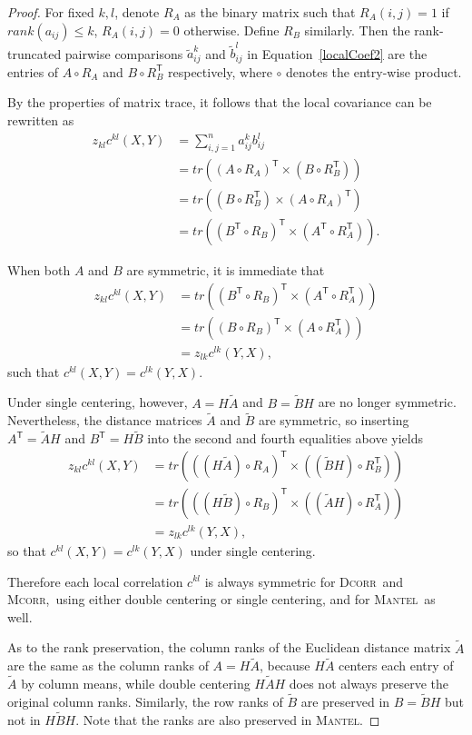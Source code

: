 \documentclass[11pt]{article}
\providecommand{\sct}[1]{{\normalfont\textsc{#1}}}
\providecommand{\mt}[1]{\widetilde{#1}}
\newcommand{\GG}{c}
\newcommand{\T}{^{\ensuremath{\mathsf{T}}}}           %
\newcommand{\Dcorr}{\sct{Dcorr}}
\newcommand{\Mcorr}{\sct{Mcorr}}
\newcommand{\Mantel}{\sct{Mantel}}
\begin{document}
\begin{proof}
For fixed $k,l$, denote $R_{A}$ as the binary matrix such that $R_{A}(i,j)=1$ if $rank(a_{ij}) \leq k$, $R_{A}(i,j)=0$ otherwise. Define $R_{B}$ similarly. Then the rank-truncated pairwise comparisons $\mt{a}_{ij}^k$ and $\mt{b}_{ij}^l$ in Equation~\ref{localCoef2} are the entries of $A \circ R_{A}$ and $B \circ R_{B}\T$ respectively, where $\circ$ denotes the entry-wise product.

By the properties of matrix trace, it follows that the local covariance can be rewritten as
\begin{align*}
z_{kl} \GG^{kl}(X,Y) &= \textstyle \sum_{i,j=1}^n a_{ij}^k b_{ij}^l \\
 &= tr((A \circ R_{A})\T \times (B \circ R_{B}\T)) \\
 &= tr((B \circ R_{B}\T) \times (A \circ R_{A})\T) \\
 &= tr((B\T \circ R_{B})\T \times (A\T \circ R_{A}\T)).
\end{align*}

When both $A$ and $B$ are symmetric, it is immediate that
\begin{align*}
z_{kl} \GG^{kl}(X,Y) &= tr((B\T \circ R_{B})\T \times (A\T \circ R_{A}\T)) \\
 &= tr((B \circ R_{B})\T \times (A \circ R_{A}\T)) \\
 &= z_{lk} \GG^{lk}(Y,X),
\end{align*}
such that $\GG^{kl}(X,Y)=\GG^{lk}(Y,X)$.

Under single centering, however, $A=H \tilde{A}$ and $B=\tilde{B}H$ are no longer symmetric. Nevertheless, the distance matrices $\tilde{A}$ and $\tilde{B}$ are symmetric, so inserting $A\T=\tilde{A}H$ and $B\T=H\tilde{B}$ into the second and fourth equalities above yields
\begin{align*}
z_{kl} \GG^{kl}(X,Y) &= tr(((H \tilde{A}) \circ R_{A})\T \times ((\tilde{B}H) \circ R_{B}\T)) \\
 &= tr(((H \tilde{B}) \circ R_{B})\T \times ((\tilde{A}H) \circ R_{A}\T)) \\
 &= z_{lk} \GG^{lk}(Y,X),
\end{align*}
so that $\GG^{kl}(X,Y)=\GG^{lk}(Y,X)$ under single centering.

Therefore each local correlation $\GG^{kl}$ is always symmetric for \Dcorr~and \Mcorr,~using either double centering or single centering, and for \Mantel~as well.

As to the rank preservation, the column ranks of the Euclidean distance matrix $\tilde{A}$ are the same as the column ranks of $A=H \tilde{A}$, because $H \tilde{A}$ centers each entry of $\tilde{A}$ by column means, while double centering $H \tilde{A} H$ does not always preserve the original column ranks. Similarly, the row ranks of $\tilde{B}$ are preserved in $B=\tilde{B}H$ but not in $H \tilde{B} H$. Note that the ranks are also preserved in \Mantel.
\end{proof}
\end{document}
